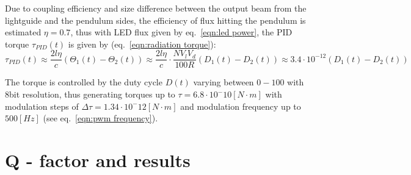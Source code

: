 \documentclass[\main/master.tex]{subfiles}
\begin{document}
\par\noindent
Due to coupling efficiency and size difference between the output beam from the lightguide and the pendulum sides, the efficiency of flux hitting the pendulum is estimated $\eta = 0.7$, thus with LED flux given by eq.~\ref{eqn:led power}, the PID torque $\tau_{PID}(t)$ is given by (eq.~\ref{eqn:radiation torque}):
\begin{equation}
\tau_{PID}(t) \approx \frac{2l\eta}{{c}} (\Theta_1(t) -\Theta_2(t)) \approx \frac{2l\eta}{{c}} \cdot\frac{N V_l V_d}{100R}(D_1(t) -D_2(t))  \approx   3.4\cdot 10^{-12}(D_1(t) -D_2(t)) 
\label{eqn:led torque}
\end{equation}
\par\noindent
The torque is controlled by the duty cycle $D(t)$ varying between $0-100$ with 8bit resolution, thus generating torques up to $\tau = 6.8\cdot10^-{10} [N\cdot m]$ with modulation steps of $\Delta\tau = 1.34\cdot10^-{12} [N\cdot m]$ and modulation frequency up to $500[Hz]$ (see eq.~\ref{eqn:pwm frequency}).
\section{Q - factor and results}
\end{document}
